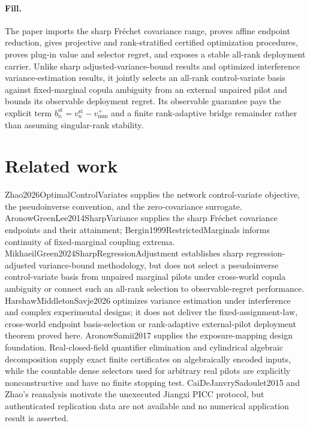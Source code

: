 \documentclass{article}
\begin{document}
\paragraph{Fill.} The paper imports the sharp Fr\'echet covariance range, proves affine endpoint reduction, gives projective and rank-stratified certified optimization procedures, proves plug-in value and selector regret, and exposes a stable all-rank deployment carrier.  Unlike sharp adjusted-variance-bound results and optimized interference variance-estimation results, it jointly selects an all-rank control-variate basis against fixed-marginal copula ambiguity from an external unpaired pilot and bounds its observable deployment regret.  Its observable guarantee pays the explicit term \(b_n^{\mathrm{st}}=v_n^{\mathrm{st}}-v_{\mathrm{mm}}^+\) and a finite rank-adaptive bridge remainder rather than assuming singular-rank stability.

\section{Related work}

Zhao2026OptimalControlVariates supplies the network control-variate objective, the pseudoinverse convention, and the zero-covariance surrogate.  AronowGreenLee2014SharpVariance supplies the sharp Fr\'echet covariance endpoints and their attainment; Bergin1999RestrictedMarginals informs continuity of fixed-marginal coupling extrema.  MikhaeilGreen2024SharpRegressionAdjustment establishes sharp regression-adjusted variance-bound methodology, but does not select a pseudoinverse control-variate basis from unpaired marginal pilots under cross-world copula ambiguity or connect such an all-rank selection to observable-regret performance.  HarshawMiddletonSavje2026 optimizes variance estimation under interference and complex experimental designs; it does not deliver the fixed-assignment-law, cross-world endpoint basis-selection or rank-adaptive external-pilot deployment theorem proved here.  AronowSamii2017 supplies the exposure-mapping design foundation.  Real-closed-field quantifier elimination and cylindrical algebraic decomposition supply exact finite certificates on algebraically encoded inputs, while the countable dense selectors used for arbitrary real pilots are explicitly nonconstructive and have no finite stopping test.  CaiDeJanvrySadoulet2015 and Zhao's reanalysis motivate the unexecuted Jiangxi PICC protocol, but authenticated replication data are not available and no numerical application result is asserted.
\end{document}
